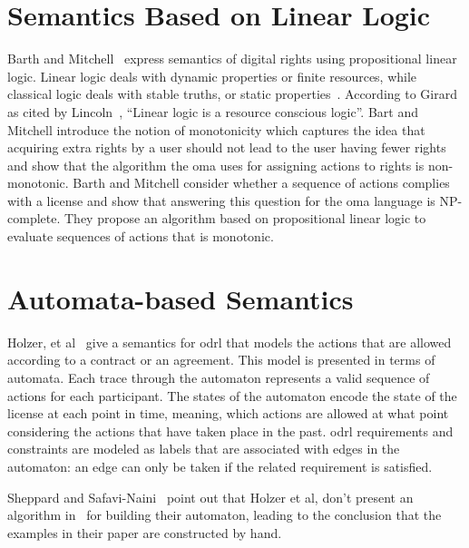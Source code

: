 \section{Semantics Based on Linear Logic}

Barth and Mitchell~\cite{BarthM06} express semantics of digital rights using propositional linear logic. Linear logic deals with dynamic properties or finite resources, while classical logic deals with stable truths, or static properties~\cite{Girard87}. According to Girard as cited by Lincoln~\cite{Lincoln}, ``Linear logic is a resource conscious logic''. Bart and Mitchell introduce the notion of monotonicity which captures the idea that acquiring extra rights by a user should not lead to the user having fewer rights and show that the algorithm the \ac{oma} uses for assigning actions to rights is non-monotonic. Barth and Mitchell consider whether a sequence of actions complies with a license and show that answering this question for the \ac{oma} language is NP-complete. They propose an algorithm based on propositional linear logic to evaluate sequences of actions that is monotonic.

\section{Automata-based Semantics}
Holzer, et al~\cite{Holzer} give a semantics for \ac{odrl} that models the actions that are allowed according to a contract or an agreement. This model is presented in terms of automata. Each trace through the automaton represents a valid sequence of actions for each participant. The states of the automaton encode the state of the license at each point in time, meaning, which actions are allowed at what point considering the actions that have taken place in the past. \ac{odrl} requirements and constraints are modeled as labels that are associated with edges in the automaton: an edge can only be taken if the related requirement is satisfied. 

Sheppard and Safavi-Naini~\cite{SheppardS09} point out that Holzer et al, don't present an algorithm in~\cite{Holzer} for building their automaton, leading to the conclusion that the examples in their paper are constructed by hand.

